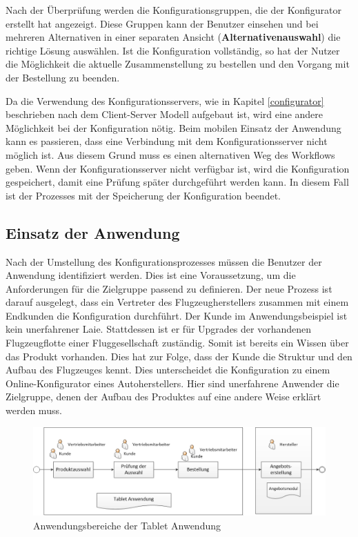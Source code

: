 Nach der Überprüfung werden die  Konfigurationsgruppen, die der Konfigurator erstellt hat angezeigt. Diese Gruppen kann der Benutzer einsehen und bei mehreren Alternativen in einer 
separaten Ansicht (\textbf{Alternativenauswahl}) die richtige Lösung auswählen. Ist die Konfiguration vollständig, so hat der Nutzer die Möglichkeit die aktuelle Zusammenstellung zu bestellen und den Vorgang mit der Bestellung zu beenden. 

Da die Verwendung des Konfigurationsservers, wie in Kapitel \ref{configurator} beschrieben nach dem Client-Server Modell aufgebaut ist, wird eine andere Möglichkeit bei der Konfiguration nötig. Beim mobilen Einsatz der Anwendung kann es passieren, dass eine Verbindung mit dem Konfigurationsserver nicht möglich ist. Aus diesem Grund muss es einen alternativen Weg des Workflows geben. Wenn der Konfigurationsserver nicht verfügbar ist, wird die Konfiguration gespeichert, damit eine Prüfung später durchgeführt werden kann. In diesem Fall ist der Prozesses mit der Speicherung der Konfiguration beendet.

\subsection{Einsatz der Anwendung}
Nach der Umstellung des Konfigurationsprozesses müssen die Benutzer der Anwendung identifiziert werden. Dies ist eine Voraussetzung, um die Anforderungen für die Zielgruppe passend zu definieren. Der neue Prozess ist darauf ausgelegt, dass ein Vertreter des Flugzeugherstellers zusammen mit einem Endkunden die Konfiguration durchführt. Der Kunde im Anwendungsbeispiel ist kein unerfahrener Laie. Stattdessen ist er für Upgrades der vorhandenen Flugzeugflotte einer Fluggesellschaft zuständig. Somit ist bereits ein Wissen über das Produkt vorhanden. Dies hat zur Folge, dass der Kunde die Struktur und den Aufbau des Flugzeuges kennt. Dies unterscheidet die Konfiguration zu einem Online-Konfigurator eines Autoherstellers. Hier sind unerfahrene Anwender die Zielgruppe, denen der Aufbau des Produktes auf eine andere Weise erklärt werden muss. \par 
\begin{figure}
\centering
\includegraphics[width=\hsize]{images/konfigurationsprozess_neu}
\caption{Anwendungsbereiche der Tablet Anwendung}
\label{newWorkflow}
\end{figure}

